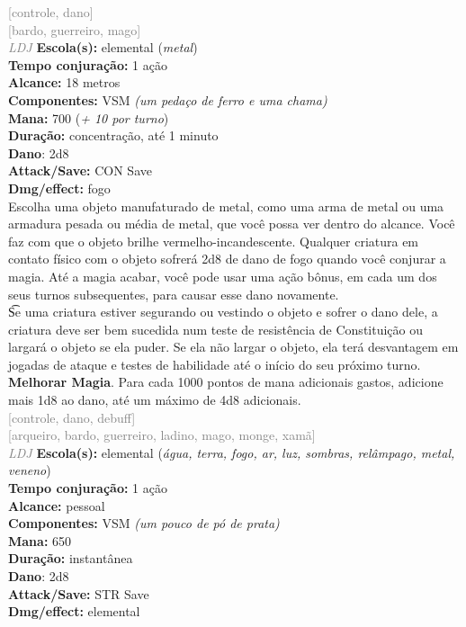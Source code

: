 \documentclass{RPG_Adventure}[2021/10/20]
\begin{document}
{\scriptsize \textcolor{gray}{[controle, dano]\\}}
{\scriptsize \textcolor{gray}{[bardo, guerreiro, mago]\\}}
{\tiny \textcolor{gray}{\textit{LDJ}}}\jump{}
{\small \t \textbf{Escola(s):} elemental (\textit{metal})\\\t \textbf{Tempo conjuração:} 1 ação\\\t \textbf{Alcance:} 18 metros\\\t \textbf{Componentes:} VSM \textit{(um pedaço de ferro e uma chama)}\\\t \textbf{Mana:} 700 (\textit{+ 10 por turno})\\\t \textbf{Duração:} concentração, até 1 minuto\\\t \textbf{Dano}: 2d8\\\t \textbf{Attack/Save:} CON Save\\\t \textbf{Dmg/effect:} fogo\\}
{\normalsize Escolha uma objeto manufaturado de metal, como uma arma de metal ou uma armadura pesada ou média de metal, que você possa ver dentro do alcance. Você faz com que o objeto brilhe vermelho-incandescente. Qualquer criatura em contato físico com o objeto sofrerá 2d8 de dano de fogo quando você conjurar a magia. Até a magia acabar, você pode usar uma ação bônus, em cada um dos seus turnos subsequentes, para causar esse dano novamente.\\\t Se uma criatura estiver segurando ou vestindo o objeto e sofrer o dano dele, a criatura deve ser bem sucedida num teste de resistência de Constituição ou largará o objeto se ela puder. Se ela não largar o objeto, ela terá desvantagem em jogadas de ataque e testes de habilidade até o início do seu próximo turno.\\\t \textbf{Melhorar Magia}. Para cada 1000 pontos de mana adicionais gastos, adicione mais 1d8 ao dano, até um máximo de 4d8 adicionais.\\}
{\scriptsize \textcolor{gray}{[controle, dano, debuff]\\}}
{\scriptsize \textcolor{gray}{[arqueiro, bardo, guerreiro, ladino, mago, monge, xamã]\\}}
{\tiny \textcolor{gray}{\textit{LDJ}}}\jump{}
{\small \t \textbf{Escola(s):} elemental (\textit{água, terra, fogo, ar, luz, sombras, relâmpago, metal, veneno})\\\t \textbf{Tempo conjuração:} 1 ação\\\t \textbf{Alcance:} pessoal\\\t \textbf{Componentes:} VSM \textit{(um pouco de pó de prata)}\\\t \textbf{Mana:} 650\\\t \textbf{Duração:} instantânea\\\t \textbf{Dano}: 2d8\\\t \textbf{Attack/Save:} STR Save\\\t \textbf{Dmg/effect:} elemental\\}
\end{document}
